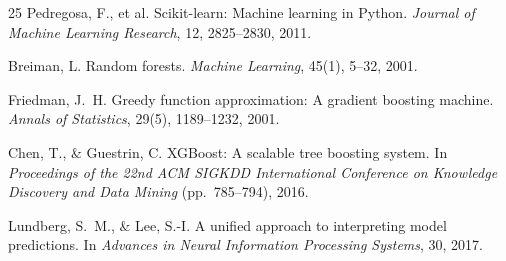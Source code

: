 \documentclass[10pt,twocolumn]{article}
\begin{document}
\begin{thebibliography}{25}
Pedregosa, F., et al.
\newblock Scikit-learn: Machine learning in Python.
\newblock \emph{Journal of Machine Learning Research}, 12, 2825--2830, 2011.

Breiman, L.
\newblock Random forests.
\newblock \emph{Machine Learning}, 45(1), 5--32, 2001.

Friedman, J.\ H.
\newblock Greedy function approximation: A gradient boosting machine.
\newblock \emph{Annals of Statistics}, 29(5), 1189--1232, 2001.

Chen, T., \& Guestrin, C.
\newblock XGBoost: A scalable tree boosting system.
\newblock In \emph{Proceedings of the 22nd ACM SIGKDD International Conference
on Knowledge Discovery and Data Mining} (pp.\ 785--794), 2016.

Lundberg, S.\ M., \& Lee, S.-I.
\newblock A unified approach to interpreting model predictions.
\newblock In \emph{Advances in Neural Information Processing Systems}, 30,
2017.

\end{thebibliography}
\end{document}
